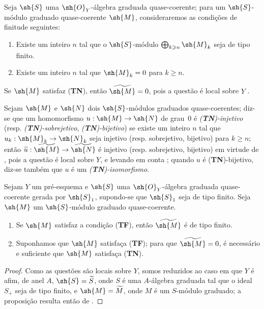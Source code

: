 \documentclass[oneside,10pt]{amsart}
\makeatletter
\renewcommand{\geq}{\geqslant}
\newcommand{\ega@arrow}[2]{\mathchoice{#1}{#2}{#2}{#2}}
\renewcommand{\to}{\ega@arrow{\longrightarrow}{\rightarrow}}
\let\EGAOriginalLabel\label
\renewcommand{\label}[1]{\phantomsection\EGAOriginalLabel{#1}}
\makeatother
\begin{document}
\begin{env}[3.4.2]
\label{II.3.4.2}
Seja $\sh{S}$ uma $\sh{O}_Y$-álgebra graduada quase-coerente;
para um $\sh{S}$-módulo graduado quase-coerente $\sh{M}$, consideraremos as condições de finitude seguintes:
\begin{enumerate}
  \item[(\textbf{TF})] Existe um inteiro $n$ tal que o $\sh{S}$-módulo $\bigoplus_{k\geq n}\sh{M}_k$ seja de tipo finito.
  \item[(\textbf{TN})] Existe um inteiro $n$ tal que $\sh{M}_k=0$ para $k\geq n$.
\end{enumerate}

Se $\sh{M}$ satisfaz (\textbf{TN}), então $\widetilde{\sh{M}}=0$, pois a questão é local sobre $Y$ .

Sejam $\sh{M}$ e $\sh{N}$ dois $\sh{S}$-módulos graduados quase-coerentes;
diz-se que um homomorfismo $u:\sh{M}\to\sh{N}$ de grau~$0$ é \emph{(\textbf{TN})-injetivo} (resp. \emph{(\textbf{TN})-sobrejetivo}, \emph{(\textbf{TN})-bijetivo}) se existe um inteiro $n$ tal que $u_k:\sh{M}_k\to\sh{N}_k$ seja injetivo (resp. sobrejetivo, bijetivo) para $k\geq n$;
então $\widetilde{u}:\widetilde{\sh{M}}\to\widetilde{\sh{N}}$ é injetivo (resp. sobrejetivo, bijetivo) em virtude de , pois a questão é local sobre $Y$, e levando em conta ;
quando $u$ é (\textbf{TN})-bijetivo, diz-se também que $u$ é um \emph{(\textbf{TN})-isomorfismo}.
\end{env}

\begin{proposition}[3.4.3]
\label{II.3.4.3}
Sejam $Y$ um pré-esquema e $\sh{S}$ uma $\sh{O}_Y$-álgebra graduada quase-coerente gerada por $\sh{S}_1$, supondo-se que $\sh{S}_1$ seja de tipo finito.
Seja $\sh{M}$ um $\sh{S}$-módulo graduado quase-coerente.
\begin{enumerate}
  \item[(i)] Se $\sh{M}$ satisfaz a condição (\textbf{TF}), então $\widetilde{\sh{M}}$ é de tipo finito.
  \item[(ii)] Suponhamos que $\sh{M}$ satisfaça (\textbf{TF}); para que $\widetilde{\sh{M}}=0$, é necessário e suficiente que $\sh{M}$ satisfaça (\textbf{TN}).
\end{enumerate}
\end{proposition}

\begin{proof}
Como as questões são locais sobre $Y$, somos reduzidos ao caso em que $Y$ é afim, de anel $A$, $\sh{S}=\widetilde{S}$, onde $S$ é uma $A$-álgebra graduada tal que o ideal $S_+$ seja de tipo finito, e $\sh{M}=\widetilde{M}$, onde $M$ é um $S$-módulo graduado;
a proposição resulta então de .
\end{proof}
\end{document}
